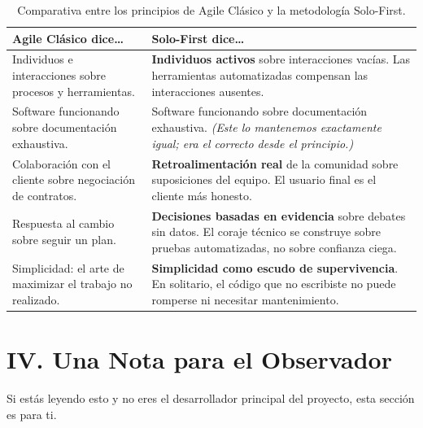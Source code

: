 \documentclass[14pt,a4paper,oneside]{extbook}
\begin{document}
\begin{table}[htbp]
\centering
\renewcommand{\arraystretch}{1.4} %

\begin{tabularx}{\textwidth}{
    >{\raggedright\arraybackslash\hsize=0.9\hsize}X 
    >{\raggedright\arraybackslash\hsize=1.1\hsize}X
}
\toprule
\textbf{Agile Clásico dice\ldots} & \textbf{Solo-First dice\ldots} \\
\midrule
Individuos e interacciones sobre procesos y herramientas. & 
\textbf{Individuos activos} sobre interacciones vacías. Las herramientas automatizadas compensan las interacciones ausentes. \\
\addlinespace
Software funcionando sobre documentación exhaustiva. & 
Software funcionando sobre documentación exhaustiva. \textit{(Este lo mantenemos exactamente igual; era el correcto desde el principio.)} \\
\addlinespace
Colaboración con el cliente sobre negociación de contratos. & 
\textbf{Retroalimentación real} de la comunidad sobre suposiciones del equipo. El usuario final es el cliente más honesto. \\
\addlinespace
Respuesta al cambio sobre seguir un plan. & 
\textbf{Decisiones basadas en evidencia} sobre debates sin datos. El coraje técnico se construye sobre pruebas automatizadas, no sobre confianza ciega. \\
\addlinespace
Simplicidad: el arte de maximizar el trabajo no realizado. & 
\textbf{Simplicidad como escudo de supervivencia}. En solitario, el código que no escribiste no puede romperse ni necesitar mantenimiento. \\
\bottomrule
\end{tabularx}
\caption{Comparativa entre los principios de Agile Clásico y la metodología Solo-First.}
\label{tab:agile_vs_solo_first}
\end{table}


\section{IV. Una Nota para el Observador}

Si estás leyendo esto y no eres el desarrollador principal del proyecto, esta sección es para ti.
\end{document}
